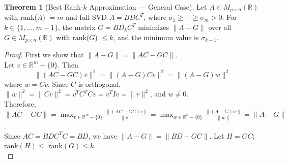 \documentclass[letterpaper, 11pt]{article}
\newcommand{\R}{\mathbb{R}}   %
\newcommand{\1}{\mathds{1}}		%
\theoremstyle{definition}
\newtheorem{theorem}{Theorem}[section]
\begin{document}
\newpage
\begin{theorem}[Best Rank-$k$ Approximation — General Case]
  Let $A \in M_{p \times n}(\R)$ with rank($A$) $= m$ and full SVD $A = BDC^T$, where $\sigma_1 \geq \cdots \geq \sigma_m > 0$. For $k \in \{1, \ldots, m-1\}$, the matrix $G = BD_kC^T$ minimizes $\|A - G\|$ over all $G \in M_{p \times n}(\R)$
  with rank($G$) $\leq k$, and the minimum value is $\sigma_{k+1}$.
\end{theorem}
\begin{proof}
  First we show that $\|A - G\| = \|AC - GC\|$.\\
  Let $v \in \R^m - \{0\}$. Then
  \[
    \|(AC - GC)v\|^2 = \|(A - G) Cv\|^2 = \|(A - G) w\|^2
  \]
  where $w = Cv$. Since $C$ is orthogonal, $\|w\|^2 = \| Cv \|^2 = v^T C^T C v = v^T I v = \| v \|^2$, and $w \neq 0$.\\
  Therefore, $\|AC - GC\| = \max_{v \in \R^m - \{0\}} \frac{\|(AC - GC)v\|}{\|v\|} = \max_{w \in \R^n - \{0\}} \frac{\|(A - G)w\|}{\|w\|} = \|A - G\|$.\\
  Since $AC = BDC^TC = BD$, we have $\| A - G \| = \| BD - GC \|$. Let $H = GC$; rank$(H) \leq $ rank$(G) \leq k$.\\
\end{proof}



% 
% 

\end{document}
